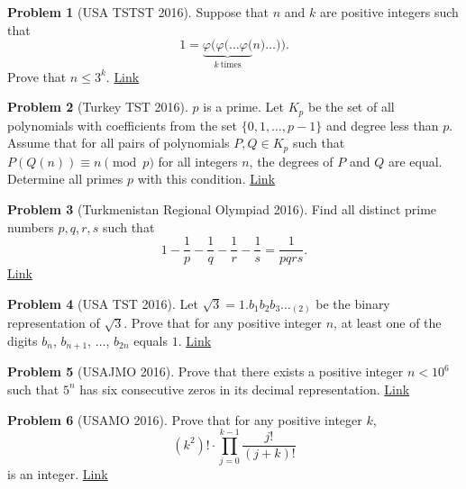 \documentclass[]{article}
\theoremstyle{definition}
\newtheorem{problem}{Problem}
\begin{document}
\begin{problem}[USA TSTST 2016]
	Suppose that $n$ and $k$ are positive integers such that \[ 1 = \underbrace{\varphi( \varphi( \dots \varphi(}_{k\ \text{times}} n) \dots )). \]Prove that $n \le 3^k$. \hfill \href{http://artofproblemsolving.com/community/c6h1264726p6580534}{Link}
\end{problem}




\begin{problem}[Turkey TST 2016]
	$p$ is a prime. Let $K_p$ be the set of all polynomials with coefficients from the set $\{0,1,\dots ,p-1\}$ and degree less than $p$. Assume that for all pairs of polynomials $P,Q\in K_p$ such that $P(Q(n))\equiv n\pmod p$ for all integers $n$, the degrees of $P$ and $Q$ are equal. Determine all primes $p$ with this condition. \hfill \href{http://artofproblemsolving.com/community/c6h1225651p6159696}{Link}
\end{problem}



\begin{problem}[Turkmenistan Regional Olympiad 2016]
	Find all distinct prime numbers $p,q,r,s$ such that $$1-\frac{1}{p} - \frac{1}{q} -\frac{1}{r} - \frac{1}{s} =\frac{1}{pqrs}.$$
	\flushright \href{http://artofproblemsolving.com/community/c6h1202195p5915235}{Link}
\end{problem}



\begin{problem}[USA TST 2016]
	Let $\sqrt 3 = 1.b_1b_2b_3 \dots _{(2)}$ be the binary representation of $\sqrt 3$. Prove that for any positive integer $n$, at least one of the digits $b_n$, $b_{n+1}$, $\dots$, $b_{2n}$ equals $1$. \hfill \href{http://artofproblemsolving.com/community/c6h1243905p6368201}{Link}
\end{problem}



\begin{problem}[USAJMO 2016]
	Prove that there exists a positive integer $n < 10^6$ such that $5^n$ has six consecutive zeros in its decimal representation. \hfill \href{http://artofproblemsolving.com/community/c5h1230489p6213569}{Link}
\end{problem}



\begin{problem}[USAMO 2016]
	Prove that for any positive integer $k$, \[(k^2)!\cdot\displaystyle\prod_{j=0}^{k-1}\frac{j!}{(j+k)!}\]is an integer. \hfill \href{http://artofproblemsolving.com/community/c5h1230499p6213627}{Link}
\end{problem}
\end{document}
